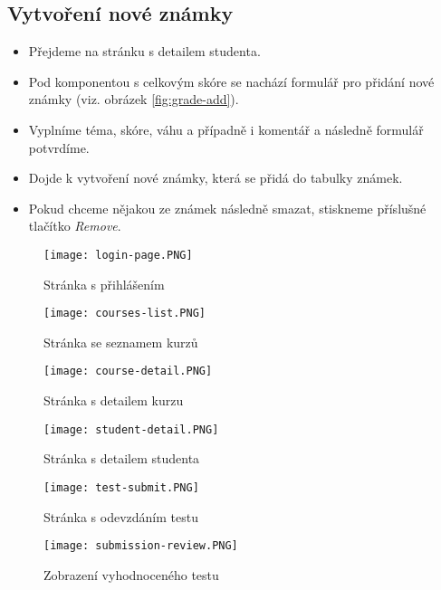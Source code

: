 \subsection{Vytvoření nové známky}
\begin{itemize}
	\item Přejdeme na stránku s detailem studenta.
	\item Pod komponentou s celkovým skóre se nachází formulář pro přidání nové známky (viz. obrázek \ref{fig:grade-add}).
	\item Vyplníme téma, skóre, váhu a případně i komentář a následně formulář potvrdíme.
	\item Dojde k vytvoření nové známky, která se přidá do tabulky známek.
	\item Pokud chceme nějakou ze známek následně smazat, stiskneme příslušné tlačítko \textit{Remove}.
\end{itemize}

\newpage

\begin{figure}
	\centering
	\texttt{[image: login-page.PNG]}
	\caption{Stránka s přihlášením}
	\label{fig:login}
\end{figure}

\begin{figure}
	\centering
	\texttt{[image: courses-list.PNG]}
	\caption{Stránka se seznamem kurzů}
	\label{fig:courses-list}
\end{figure}

\begin{figure}
	\centering
	\texttt{[image: course-detail.PNG]}
	\caption{Stránka s detailem kurzu}
	\label{fig:course-detail}
\end{figure}

\begin{figure}
	\centering
	\texttt{[image: student-detail.PNG]}
	\caption{Stránka s detailem studenta}
	\label{fig:student-detail}
\end{figure}

\begin{figure}
	\centering
	\texttt{[image: test-submit.PNG]}
	\caption{Stránka s odevzdáním testu}
	\label{fig:test-submit}
\end{figure}

\begin{figure}
	\centering
	\texttt{[image: submission-review.PNG]}
	\caption{Zobrazení vyhodnoceného testu}
	\label{fig:submission-review}
\end{figure}

